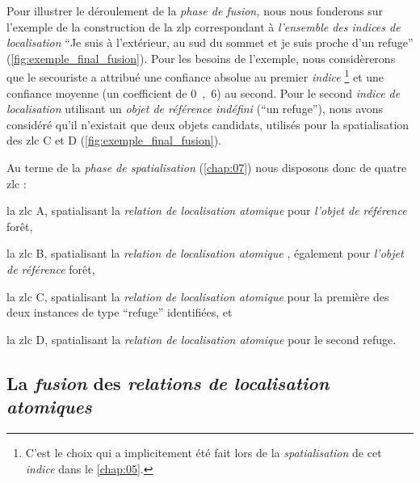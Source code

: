 Pour illustrer le déroulement de la \emph{phase de fusion,} nous nous
fonderons sur l'exemple de la construction de la \ac{zlp}
correspondant à \emph{l'ensemble des indices de localisation}
\enquote{Je suis à l'extérieur, au sud du sommet et je suis proche
  d'un refuge} (\autoref{fig:exemple_final_fusion}). Pour les besoins
de l'exemple, nous considèrerons que le secouriste a attribué une
confiance absolue au premier \emph{indice} \footnote{C'est le choix
  qui a implicitement été fait lors de la \emph{spatialisation} de cet
  \emph{indice} dans le \autoref{chap:05}.} et une confiance moyenne
(\ie un coefficient de \si{0,6}) au second. Pour le second
\emph{indice de localisation} utilisant un \emph{objet de référence
  indéfini} (\eg \enquote{un refuge}), nous avons considéré qu'il
n'existait que deux objets candidats, utilisés pour la spatialisation
des \ac{zlc} \textcolor{RdBu-9-8}{\textsf{C}} et
\textcolor{RdBu-9-9}{\textsf{D}} (\autoref{fig:exemple_final_fusion}).

Au terme de la \emph{phase de spatialisation} (\autoref{chap:07}) nous
disposons donc de quatre \ac{zlc} :
% 
\begin{enumerate*}[label=(\arabic*)]
\item la \ac{zlc} \textcolor{RdBu-9-1}{\textsf{A}}, spatialisant la
  \emph{relation de localisation atomique}  pour
  \emph{l'objet de référence} forêt,
\item la \ac{zlc} \textcolor{RdBu-9-2}{\textsf{B}}, spatialisant la
  \emph{relation de localisation atomique} ,
  également pour \emph{l'objet de référence} forêt,
\item la \ac{zlc} \textcolor{RdBu-9-8}{\textsf{C}}, spatialisant la
  \emph{relation de localisation atomique}  pour
  la première des deux instances de type \enquote{refuge} identifiées,
  et
\item la \ac{zlc} \textcolor{RdBu-9-9}{\textsf{D}}, spatialisant la
  \emph{relation de localisation atomique}  pour
  le second refuge.
\end{enumerate*}

\subsection{La \emph{fusion} des \emph{relations de localisation
    atomiques}}

